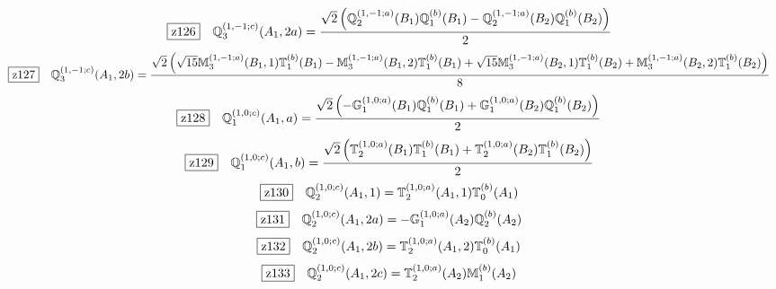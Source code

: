 \documentclass[fleqn,10pt,landscape]{jsarticle}
\begin{document}
\begin{dmath*}
\hspace*{3mm}\fbox{z126}\quad \mathbb{Q}_{3}^{(1,-1;c)}(A_{1},2a)=\frac{\sqrt{2} \left(\mathbb{Q}_{2}^{(1,-1;a)}(B_{1}) \mathbb{Q}_{1}^{(b)}(B_{1}) - \mathbb{Q}_{2}^{(1,-1;a)}(B_{2}) \mathbb{Q}_{1}^{(b)}(B_{2})\right)}{2}
\end{dmath*}
\begin{dmath*}
\hspace*{3mm}\fbox{z127}\quad \mathbb{Q}_{3}^{(1,-1;c)}(A_{1},2b)=\frac{\sqrt{2} \left(\sqrt{15} \mathbb{M}_{3}^{(1,-1;a)}(B_{1},1) \mathbb{T}_{1}^{(b)}(B_{1}) - \mathbb{M}_{3}^{(1,-1;a)}(B_{1},2) \mathbb{T}_{1}^{(b)}(B_{1}) + \sqrt{15} \mathbb{M}_{3}^{(1,-1;a)}(B_{2},1) \mathbb{T}_{1}^{(b)}(B_{2}) + \mathbb{M}_{3}^{(1,-1;a)}(B_{2},2) \mathbb{T}_{1}^{(b)}(B_{2})\right)}{8}
\end{dmath*}
\begin{dmath*}
\hspace*{3mm}\fbox{z128}\quad \mathbb{Q}_{1}^{(1,0;c)}(A_{1},a)=\frac{\sqrt{2} \left(- \mathbb{G}_{1}^{(1,0;a)}(B_{1}) \mathbb{Q}_{1}^{(b)}(B_{1}) + \mathbb{G}_{1}^{(1,0;a)}(B_{2}) \mathbb{Q}_{1}^{(b)}(B_{2})\right)}{2}
\end{dmath*}
\begin{dmath*}
\hspace*{3mm}\fbox{z129}\quad \mathbb{Q}_{1}^{(1,0;c)}(A_{1},b)=\frac{\sqrt{2} \left(\mathbb{T}_{2}^{(1,0;a)}(B_{1}) \mathbb{T}_{1}^{(b)}(B_{1}) + \mathbb{T}_{2}^{(1,0;a)}(B_{2}) \mathbb{T}_{1}^{(b)}(B_{2})\right)}{2}
\end{dmath*}
\begin{dmath*}
\hspace*{3mm}\fbox{z130}\quad \mathbb{Q}_{2}^{(1,0;c)}(A_{1},1)=\mathbb{T}_{2}^{(1,0;a)}(A_{1},1) \mathbb{T}_{0}^{(b)}(A_{1})
\end{dmath*}
\begin{dmath*}
\hspace*{3mm}\fbox{z131}\quad \mathbb{Q}_{2}^{(1,0;c)}(A_{1},2a)=- \mathbb{G}_{1}^{(1,0;a)}(A_{2}) \mathbb{Q}_{2}^{(b)}(A_{2})
\end{dmath*}
\begin{dmath*}
\hspace*{3mm}\fbox{z132}\quad \mathbb{Q}_{2}^{(1,0;c)}(A_{1},2b)=\mathbb{T}_{2}^{(1,0;a)}(A_{1},2) \mathbb{T}_{0}^{(b)}(A_{1})
\end{dmath*}
\begin{dmath*}
\hspace*{3mm}\fbox{z133}\quad \mathbb{Q}_{2}^{(1,0;c)}(A_{1},2c)=\mathbb{T}_{2}^{(1,0;a)}(A_{2}) \mathbb{M}_{1}^{(b)}(A_{2})
\end{dmath*}
\end{document}
